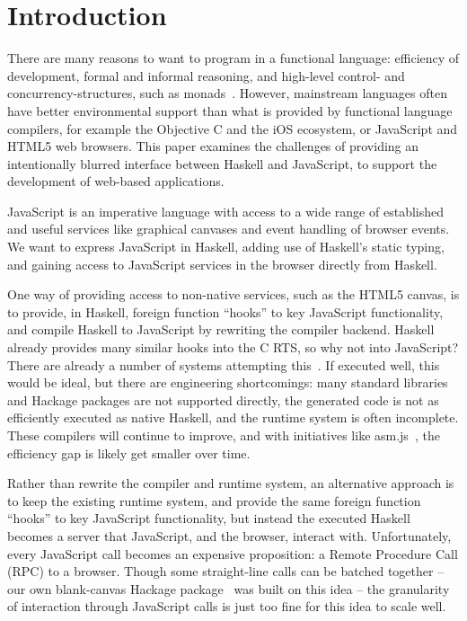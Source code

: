 \documentclass{llncs}
\begin{document}
\section{Introduction}\label{sec:intro}

There are many reasons to want to program in a functional language:
efficiency of development, formal and informal reasoning, and high-level 
control- and concurrency-structures, such as monads~\cite{...}.
However, mainstream languages often have better environmental support
than what is provided by functional language compilers,
for example the Objective C and the iOS ecosystem, or JavaScript and HTML5
web browsers.
This paper examines the challenges of providing
an intentionally blurred interface between Haskell
and JavaScript, to support the development of web-based applications.

JavaScript is an imperative language with access to a wide range
of established and useful services like graphical canvases and event
handling of browser events. 
We want to express JavaScript in Haskell, adding use
of Haskell's static typing, and gaining access to JavaScript services
in the browser directly from Haskell.


One way of providing access to non-native services,
such as the HTML5 canvas, is to provide, in Haskell, 
foreign function ``hooks'' to key JavaScript functionality,
and compile Haskell to JavaScript by rewriting the
compiler backend.
Haskell already provides many similar hooks into the C RTS,
so why not into JavaScript?
There are already a number of systems attempting this~\cite{...}.
If executed well, this would be ideal,
but there are engineering shortcomings: 
many standard libraries and Hackage packages are not supported directly,
the generated code is not as efficiently executed as native Haskell, and
the runtime system is often incomplete. These compilers will continue
to improve, and with initiatives like asm.js~\cite{...},
the efficiency gap is likely get smaller over time.

Rather than rewrite the compiler and runtime system,
an alternative approach is to keep the existing
runtime system, and provide the same 
foreign function ``hooks'' to key JavaScript functionality,
but instead the executed Haskell becomes a server that JavaScript,
and the browser, interact with.
Unfortunately, every JavaScript call becomes an expensive proposition: a Remote Procedure Call (RPC)
to a browser.
Though some straight-line calls can be batched together --
our own blank-canvas Hackage package~\cite{Hackage:11:blank-canvas} was built on this idea --
the granularity of interaction through JavaScript calls is just too fine for
this idea to scale well.
\end{document}
